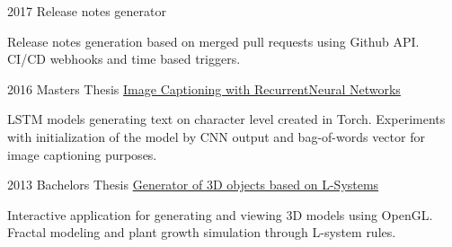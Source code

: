 \documentclass{tccv}
\begin{document}
\begin{eventlist}

	\item{2017}
	{}
	{Release notes generator}
	
	Release notes generation based on merged pull requests using Github API. CI/CD webhooks and time based triggers.

	\item{2016}
	{Masters Thesis}
	{{\href{https://github.com/kvitajakub/MasterThesis}{Image Captioning with Recurrent\newline Neural Networks}}}
	
	LSTM models generating text on character level created in Torch. Experiments with initialization of the model by CNN output and bag-of-words vector for image captioning purposes. 
	
	\item{2013}
	{Bachelors Thesis}
	{{\href{https://github.com/kvitajakub/LSystemModeller}{Generator of 3D objects based on L-Systems}}}
	
	Interactive application for generating and viewing 3D models using OpenGL. Fractal modeling and plant growth simulation through L-system rules.
	
\end{eventlist}
\end{document}
